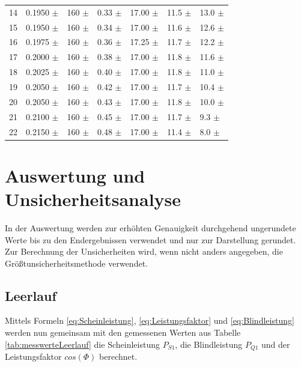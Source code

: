 \documentclass[12pt,a4paper,twoside]{article}
\begin{document}
\begin{table}[H]
\begin{tabular}{| l | l | l | l | l | l | l |}
        14 & 0.1950 $\pm$  & 160 $\pm$  & 0.33 $\pm$  & 17.00 $\pm$  & 11.5 $\pm$ & 13.0 $\pm$  \\
        15 & 0.1950 $\pm$  & 160 $\pm$  & 0.34 $\pm$  & 17.00 $\pm$  & 11.6 $\pm$ & 12.6 $\pm$  \\
        16 & 0.1975 $\pm$  & 160 $\pm$  & 0.36 $\pm$  & 17.25 $\pm$  & 11.7 $\pm$ & 12.2 $\pm$  \\
        17 & 0.2000 $\pm$  & 160 $\pm$  & 0.38 $\pm$  & 17.00 $\pm$  & 11.8 $\pm$ & 11.6 $\pm$  \\
        18 & 0.2025 $\pm$  & 160 $\pm$  & 0.40 $\pm$  & 17.00 $\pm$  & 11.8 $\pm$ & 11.0 $\pm$  \\
        19 & 0.2050 $\pm$  & 160 $\pm$  & 0.42 $\pm$  & 17.00 $\pm$  & 11.7 $\pm$ & 10.4 $\pm$  \\
        20 & 0.2050 $\pm$  & 160 $\pm$  & 0.43 $\pm$  & 17.00 $\pm$  & 11.8 $\pm$ & 10.0 $\pm$  \\
        21 & 0.2100 $\pm$  & 160 $\pm$  & 0.45 $\pm$  & 17.00 $\pm$  & 11.7 $\pm$ & 9.3 $\pm$  \\
        22 & 0.2150 $\pm$  & 160 $\pm$  & 0.48 $\pm$  & 17.00 $\pm$  & 11.4 $\pm$ & 8.0 $\pm$  \\
        \hline
    \end{tabular}
\end{table}



\section{Auswertung und Unsicherheitsanalyse} %

In der Auswertung werden zur erhöhten Genauigkeit durchgehend ungerundete Werte bis zu den Endergebnissen verwendet und nur zur Darstellung gerundet. \\
Zur Berechnung der Unsicherheiten wird, wenn nicht anders angegeben, die Größtunsicherheitsmethode verwendet.

\subsection{Leerlauf}

Mittels Formeln \ref{eq:Scheinleistung}, \ref{eq:Leistungsfaktor} und \ref{eq:Blindleistung} werden nun gemeinsam mit den gemessenen Werten aus Tabelle \ref{tab:messwerteLeerlauf} die Scheinleistung $P_{S1}$, die Blindleistung $P_{Q1}$ und der Leistungsfaktor $cos(\Phi)$ berechnet.
\end{document}
